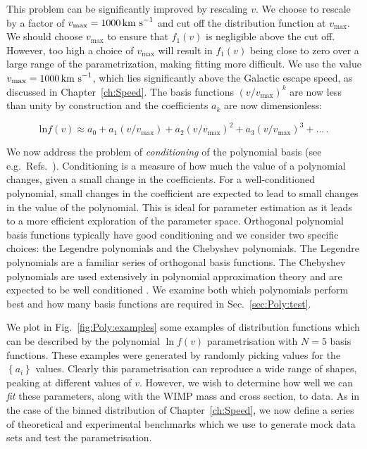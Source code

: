 This problem can be significantly improved by rescaling $v$. We choose to rescale by a factor of $v_\textrm{max} = 1000 \,\textrm{km s}^{-1}$ and cut off the distribution function at $v_\textrm{max}$. We should choose $v_\textrm{max}$ to ensure that $f_1(v)$ is negligible above the cut off. However, too high a choice of $v_\textrm{max}$ will result in $f_1(v)$ being close to zero over a large range of the parametrization, making fitting more difficult. We use the value $v_\textrm{max} = 1000 \,\textrm{km s}^{-1}$, which lies significantly above the Galactic escape speed, as discussed in Chapter~\ref{ch:Speed}. The basis functions $(v/v_\textrm{max})^k$ are now less than unity by construction and the coefficients $a_k$ are now dimensionless:

\begin{equation}
\textrm{ln}f(v) \approx a_0 + a_1 (v/v_\textrm{max}) + a_2 (v/v_\textrm{max})^2 + a_3 (v/v_\textrm{max})^3 + ...\,.
\end{equation}

We now address the problem of \textit{conditioning} of the polynomial basis (see e.g.\ Refs.~\cite{Gautschi:1978, Wilkinson:1984}). Conditioning is a measure of how much the value of a polynomial changes, given a small change in the coefficients. For a well-conditioned polynomial, small changes in the coefficient are expected to lead to small changes in the value of the polynomial. This is ideal for parameter estimation as it leads to a more efficient exploration of the parameter space. Orthogonal polynomial basis functions typically have good conditioning \cite{Gautschi:1978} and we consider two specific choices: the Legendre polynomials and the Chebyshev polynomials. The Legendre polynomials are a familiar series of orthogonal basis functions. The Chebyshev polynomials are used extensively in polynomial approximation theory \cite{Mason:2002} and are expected to be well conditioned \cite{Gautschi:1978}. We examine both which polynomials perform best and how many basis functions are required in Sec.~\ref{sec:Poly:test}.

We plot in Fig.~\ref{fig:Poly:examples} some examples of distribution functions which can be described by the polynomial $\ln f(v)$ parametrisation with $N=5$ basis functions. These examples were generated by randomly picking values for the $\left\{a_i\right\}$ values. Clearly this parametrisation can reproduce a wide range of shapes, peaking at different values of $v$. However, we wish to determine how well we can \textit{fit} these parameters, along with the WIMP mass and cross section, to data. As in the case of the binned distribution of Chapter~\ref{ch:Speed}, we now define a series of theoretical and experimental benchmarks which we use to generate mock data sets and test the parametrisation. 


